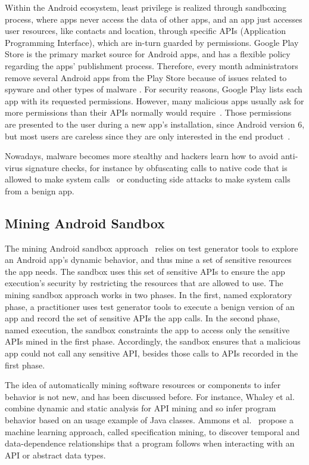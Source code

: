 Within the Android ecosystem, least privilege is realized through sandboxing process, where apps never access the data of other apps, and an app just accesses user resources, like contacts and location, through specific APIs (Application Programming Interface), which are in-turn guarded by permissions. Google Play Store is the primary market source for Android apps, and has a flexible policy regarding the apps' publishment process. Therefore, every month administrators remove several Android apps from the Play Store because of issues related to spyware and other types of malware \cite{DBLP:conf/msr/WangLL0X18}. For security reasons, Google Play lists each app with its requested permissions. However, many malicious apps usually ask for more permissions than their APIs normally would require~\cite{DBLP:conf/ccs/FeltCHSW11}. Those permissions are presented to the user during a new app's installation, since Android version 6, but most users are careless since they are only interested in the end product~\cite{DBLP:conf/soups/FeltHEHCW12}. 

Nowadays, malware becomes more stealthy and hackers learn how to avoid anti-virus signature checks, for instance by obfuscating calls to native code that is allowed to make system calls~\cite{DBLP:journals/corr/abs-2002-04540} or conducting side attacks to make system calls from a benign app.

\subsection{Mining Android Sandbox}

The mining Android sandbox approach~\cite{DBLP:conf/icse/JamrozikSZ16} relies on test generator tools to explore an Android app's dynamic behavior, and thus mine a set of sensitive resources the app needs. The sandbox uses this set of sensitive APIs to ensure the app execution's security by restricting the resources that are allowed to use. The mining sandbox approach works in two phases. In the first, named exploratory phase, a practitioner uses test generator tools to execute a benign version of an app and record the set of sensitive APIs the app calls. In the second phase, named execution, the sandbox constraints the app to access only the sensitive APIs mined in the first phase. Accordingly, the sandbox ensures that a malicious app could not call any sensitive API, besides those calls to APIs recorded in the first phase.

The idea of automatically mining software resources or components to infer behavior is not new, and has been discussed before. For instance, Whaley et al.~\cite{DBLP:conf/issta/WhaleyML02} combine dynamic and static analysis for API mining and so infer program behavior based on an usage example of Java classes. Ammons et al.~\cite{DBLP:conf/popl/AmmonsBL02} propose a machine learning approach, called specification mining, to discover temporal and data-dependence relationships that a program follows when interacting with an API or abstract data types.

